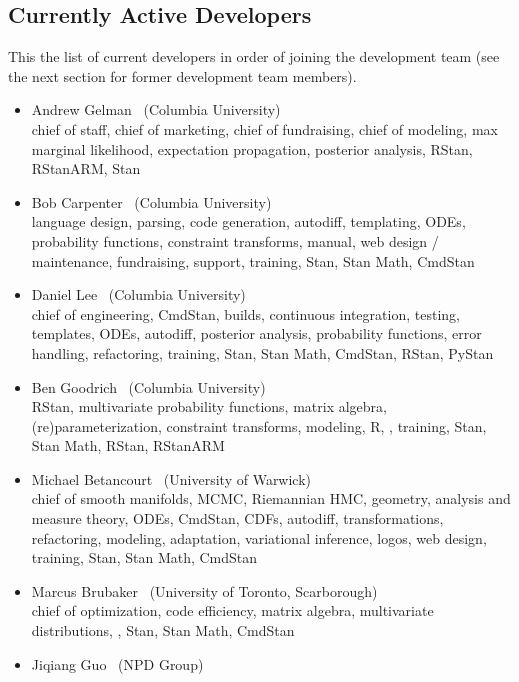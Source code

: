 \subsection*{Currently Active Developers}

This the list of current developers in order of joining the
development team (see the next section for former development team
members).

\begin{itemize}
\item Andrew Gelman \ (Columbia University)
\\ {\footnotesize chief of staff, chief of marketing, chief of
  fundraising, chief of modeling, max marginal likelihood,
  expectation propagation,  posterior analysis, RStan, RStanARM, Stan}
\item Bob Carpenter \ (Columbia University) \\ {\footnotesize language
    design, parsing, code generation, autodiff, templating, ODEs,
    probability functions, constraint transforms, manual, web design /
    maintenance, fundraising, support, training, Stan, Stan
    Math, CmdStan}
\item Daniel Lee \   (Columbia University)
\\ {\footnotesize chief of engineering, CmdStan, builds, continuous
  integration, testing, templates, ODEs, autodiff,
  posterior analysis, probability functions, error handling,
  refactoring, training, Stan, Stan Math, CmdStan, RStan, PyStan}
\item Ben Goodrich \   (Columbia University)
\\ {\footnotesize RStan, multivariate probability functions, matrix algebra,
  (re)parameterization, constraint transforms, modeling, R, \Cpp,
  training, Stan, Stan Math,  RStan, RStanARM}
\item Michael Betancourt \ (University of Warwick) \\
  {\footnotesize chief of smooth manifolds, MCMC, Riemannian HMC,
    geometry, analysis and measure theory, ODEs, CmdStan, CDFs,
    autodiff, transformations, refactoring, modeling, adaptation, variational
    inference, logos, web design, training, Stan, Stan Math, CmdStan}
\item Marcus Brubaker \   (University of Toronto, Scarborough)
\\ {\footnotesize chief of optimization, code efficiency, matrix
  algebra, multivariate distributions, \Cpp, Stan, Stan Math, CmdStan}
\item Jiqiang Guo \   (NPD Group)

\end{itemize}
